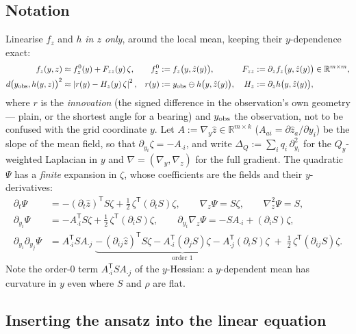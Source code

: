 \documentclass[11pt,a4paper]{article}
\newcommand{\R}{\mathbb{R}}
\newcommand{\T}{^{\mathsf T}}
\newcommand{\zh}{\hat{z}}
\newcommand{\abs}[1]{\left\lvert #1 \right\rvert}
\newcommand{\grad}{\nabla}
\newcommand{\gy}{\nabla_{\!y}}
\newcommand{\gz}{\nabla_{\!z}}
\theoremstyle{plain}
\theoremstyle{definition}
\theoremstyle{remark}
\begin{document}
\subsection{Notation}

Linearise $f_z$ and $h$ \emph{in $z$ only}, around the local mean, keeping their $y$-dependence exact:
\begin{align*}
  f_z(y,z) &\approx f_z^0(y) + F_{zz}(y)\,\zeta, & f_z^0 &:= f_z\big(y,\zh(y)\big), & F_{zz} &:= \partial_zf_z\big(y,\zh(y)\big)\in\R^{m\times m},\\
  d\big(y_{\rm obs},h(y,z)\big)^2 &\approx \abs{r(y)-H_z(y)\,\zeta}^2, & r(y) &:= y_{\rm obs}\ominus h\big(y,\zh(y)\big), & H_z &:= \partial_zh\big(y,\zh(y)\big),
\end{align*}
where $r$ is the \emph{innovation} (the signed difference in the observation's own geometry --- plain, or the shortest angle for a bearing) and $y_{\rm obs}$ the observation, not to be confused with the grid coordinate $y$. Let $A := \gy\zh\in\R^{m\times k}$ ($A_{ai}=\partial\zh_a/\partial y_i$) be the slope of the mean field, so that $\partial_{y_i}\zeta = -A_{\cdot i}$, and write $\Delta_Q := \sum_iq_i\,\partial_{y_i}^2$ for the $Q_y$-weighted Laplacian in $y$ and $\grad = (\gy,\gz)$ for the full gradient. The quadratic $\Psi$ has a \emph{finite} expansion in $\zeta$, whose coefficients are the fields and their $y$-derivatives:
\begin{align}
  \partial_t\Psi &= -(\partial_t\zh)\T S\zeta + \tfrac12\,\zeta\T(\partial_tS)\zeta, \qquad
  \gz\Psi = S\zeta, \qquad \gz^2\Psi = S, \label{eq:T_dPsi}\\
  \partial_{y_i}\Psi &= -A_{\cdot i}\T S\zeta + \tfrac12\,\zeta\T(\partial_iS)\zeta, \qquad
  \partial_{y_i}\gz\Psi = -SA_{\cdot i} + (\partial_iS)\zeta, \nonumber\\
  \partial_{y_i}\partial_{y_j}\Psi &= A_{\cdot i}\T SA_{\cdot j}
   \;\underbrace{-\,(\partial_{ij}\zh)\T S\zeta - A_{\cdot i}\T(\partial_jS)\zeta - A_{\cdot j}\T(\partial_iS)\zeta}_{\text{order 1}}
   \;+\;\tfrac12\,\zeta\T(\partial_{ij}S)\zeta . \nonumber
\end{align}
Note the order-0 term $A_{\cdot i}\T SA_{\cdot j}$ of the $y$-Hessian: a $y$-dependent mean has curvature in $y$ even where $S$ and $\rho$ are flat.

\subsection{Inserting the ansatz into the linear equation}
\end{document}
